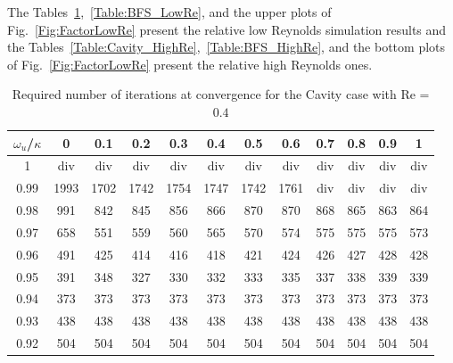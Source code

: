 \documentclass[final,3p,times,11pt,onecolumn]{myElsarticle}
\numberwithin{equation}{section}
\begin{document}
The Tables~\ref{Table:Cavity_LowRe},~\ref{Table:BFS_LowRe}, and the upper plots of Fig.~\ref{Fig:FactorLowRe} present the relative low Reynolds simulation results  and the Tables~\ref{Table:Cavity_HighRe},~\ref{Table:BFS_HighRe}, and the bottom plots of Fig.~\ref{Fig:FactorLowRe} present the relative high Reynolds ones. 
\begin{table}[b!!]
\centering
\begin{tabular}{c|ccccccccccc}
\hline 
$\omega_u$/$\kappa$ & 0 & 0.1 & 0.2 & 0.3 & 0.4 & 0.5 & 0.6 & 0.7 & 0.8 & 0.9 & 1 \\ 
\hline 
1 & div & div & div & div & div & div & div & div & div & div & div \\ 
0.99 & 1993 & 1702 & 1742 & 1754 & 1747 & 1742 & 1761 & div & div & div & div \\ 
0.98 & 991 & 842  & 845 & 856 & 866 & 870 & 870 & 868 & 865 & 863 & 864 \\ 
0.97 & 658 & 551  & 559 & 560 & 565 & 570 & 574 & 575 & 575 & 575 & 573 \\ 
0.96 & 491 &425  & 414 & 416 & 418 & 421 & 424 & 426 & 427 & 428 & 428 \\ 
0.95 & 391 & 348 & 327 & 330 & 332 & 333 & 335 & 337 & 338 & 339 & 339 \\ 
0.94 & 373 & 373 & 373 & 373 & 373 & 373 & 373 & 373 & 373 & 373 & 373 \\ 
0.93 & 438 & 438 & 438 & 438 & 438 & 438 & 438 & 438 & 438 & 438 & 438 \\ 
0.92 & 504 & 504 & 504 & 504 & 504 & 504 & 504 & 504 & 504 & 504 & 504 \\ 
\hline 
\end{tabular} 
\caption{Required number of iterations at convergence for the Cavity case with Re = $0.4$}
\label{Table:Cavity_LowRe}
\end{table}
\end{document}
